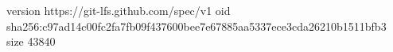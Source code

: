 version https://git-lfs.github.com/spec/v1
oid sha256:c97ad14c00fc2fa7fb09f437600bee7e67885aa5337ece3cda26210b1511bfb3
size 43840
